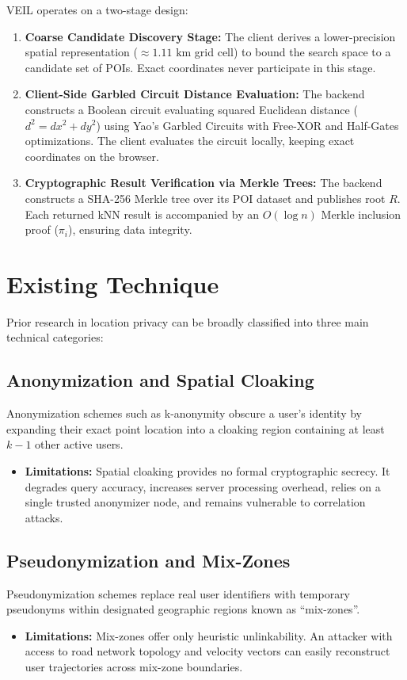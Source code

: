 \documentclass[12pt,a4paper,oneside]{report}
\begin{document}
VEIL operates on a two-stage design:
\begin{enumerate}
    \item \textbf{Coarse Candidate Discovery Stage:} The client derives a lower-precision spatial representation ($\approx 1.11\text{ km}$ grid cell) to bound the search space to a candidate set of POIs. Exact coordinates never participate in this stage.
    \item \textbf{Client-Side Garbled Circuit Distance Evaluation:} The backend constructs a Boolean circuit evaluating squared Euclidean distance ($d^2 = dx^2 + dy^2$) using Yao's Garbled Circuits with Free-XOR and Half-Gates optimizations. The client evaluates the circuit locally, keeping exact coordinates on the browser.
    \item \textbf{Cryptographic Result Verification via Merkle Trees:} The backend constructs a SHA-256 Merkle tree over its POI dataset and publishes root $R$. Each returned kNN result is accompanied by an $O(\log n)$ Merkle inclusion proof ($\pi_i$), ensuring data integrity.
\end{enumerate}

\section{Existing Technique}
Prior research in location privacy can be broadly classified into three main technical categories:

\subsection{Anonymization and Spatial Cloaking}
Anonymization schemes such as k-anonymity obscure a user's identity by expanding their exact point location into a cloaking region containing at least $k-1$ other active users.
\begin{itemize}
    \item \textbf{Limitations:} Spatial cloaking provides no formal cryptographic secrecy. It degrades query accuracy, increases server processing overhead, relies on a single trusted anonymizer node, and remains vulnerable to correlation attacks.
\end{itemize}

\subsection{Pseudonymization and Mix-Zones}
Pseudonymization schemes replace real user identifiers with temporary pseudonyms within designated geographic regions known as ``mix-zones''.
\begin{itemize}
    \item \textbf{Limitations:} Mix-zones offer only heuristic unlinkability. An attacker with access to road network topology and velocity vectors can easily reconstruct user trajectories across mix-zone boundaries.
\end{itemize}
\end{document}
